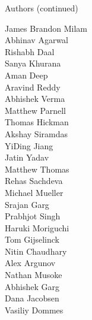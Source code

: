 \begin{frame}{Authors (continued)}
\begin{multicols}{5}
James Brandon Milam\\
Abhinav Agarwal\\
Rishabh Daal\\
Sanya Khurana\\
Aman Deep\\
Aravind Reddy\\
Abhishek Verma\\
Matthew Parnell\\
Thomas Hickman\\
Akshay Siramdas\\
YiDing Jiang\\
Jatin Yadav\\
Matthew Thomas\\
Rehas Sachdeva\\
Michael Mueller\\
Srajan Garg\\
Prabhjot Singh\\
Haruki Moriguchi\\
Tom Gijselinck\\
Nitin Chaudhary\\
Alex Argunov\\
Nathan Musoke\\
Abhishek Garg\\
Dana Jacobsen\\
Vasiliy Dommes\\
\end{multicols}
\end{frame}

